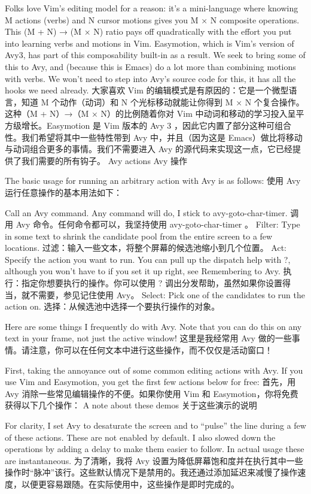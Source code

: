 \documentclass[lang=cn,color=blue]{elegantbook}
\begin{document}
Folks love Vim’s editing model for a reason: it’s a mini-language where knowing M actions (verbs) and N cursor motions gives you M × N composite operations. This (M + N) → (M × N) ratio pays off quadratically with the effort you put into learning verbs and motions in Vim. Easymotion, which is Vim’s version of Avy3, has part of this composability built-in as a result. We seek to bring some of this to Avy, and (because this is Emacs) do a lot more than combining motions with verbs. We won’t need to step into Avy’s source code for this, it has all the hooks we need already.
大家喜欢 Vim 的编辑模式是有原因的：它是一个微型语言，知道 M 个动作（动词）和 N 个光标移动就能让你得到 M × N 个复合操作。这种（M + N）→（M × N）的比例随着你对 Vim 中动词和移动的学习投入呈平方级增长。Easymotion 是 Vim 版本的 Avy 3 ，因此它内置了部分这种可组合性。我们希望将其中一些特性带到 Avy 中，并且（因为这是 Emacs）做比将移动与动词组合更多的事情。我们不需要进入 Avy 的源代码来实现这一点，它已经提供了我们需要的所有钩子。
Avy actions  Avy 操作

The basic usage for running an arbitrary action with Avy is as follows:
使用 Avy 运行任意操作的基本用法如下：

Call an Avy command. Any command will do, I stick to avy-goto-char-timer.
调用 Avy 命令。任何命令都可以，我坚持使用 avy-goto-char-timer 。
Filter: Type in some text to shrink the candidate pool from the entire screen to a few locations.
过滤：输入一些文本，将整个屏幕的候选池缩小到几个位置。
Act: Specify the action you want to run. You can pull up the dispatch help with ?, although you won’t have to if you set it up right, see Remembering to Avy.
执行：指定你想要执行的操作。你可以使用 ? 调出分发帮助，虽然如果你设置得当，就不需要，参见记住使用 Avy。
Select: Pick one of the candidates to run the action on.
选择：从候选池中选择一个要执行操作的对象。

Here are some things I frequently do with Avy. Note that you can do this on any text in your frame, not just the active window!
这里是我经常用 Avy 做的一些事情。请注意，你可以在任何文本中进行这些操作，而不仅仅是活动窗口！

First, taking the annoyance out of some common editing actions with Avy. If you use Vim and Easymotion, you get the first few actions below for free:
首先，用 Avy 消除一些常见编辑操作的不便。如果你使用 Vim 和 Easymotion，你将免费获得以下几个操作：
A note about these demos
关于这些演示的说明

For clarity, I set Avy to desaturate the screen and to “pulse” the line during a few of these actions. These are not enabled by default. I also slowed down the operations by adding a delay to make them easier to follow. In actual usage these are instantaneous.
为了清晰，我将 Avy 设置为降低屏幕饱和度并在执行其中一些操作时“脉冲”该行。这些默认情况下是禁用的。我还通过添加延迟来减慢了操作速度，以便更容易跟随。在实际使用中，这些操作是即时完成的。
\end{document}
